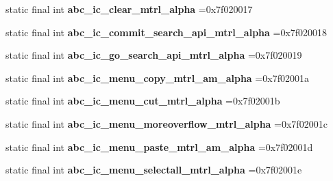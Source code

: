 \begin{DoxyCompactItemize}
\item 
\mbox{\label{classproject4_1_1xaria_1_1R_1_1drawable_a109df00d02effba1b95fb2a04dbc3ffc}} 
static final int {\bfseries abc\+\_\+ic\+\_\+clear\+\_\+mtrl\+\_\+alpha} =0x7f020017
\item 
\mbox{\label{classproject4_1_1xaria_1_1R_1_1drawable_a8fbcc6db37848e33c7275c6ebd2cf23a}} 
static final int {\bfseries abc\+\_\+ic\+\_\+commit\+\_\+search\+\_\+api\+\_\+mtrl\+\_\+alpha} =0x7f020018
\item 
\mbox{\label{classproject4_1_1xaria_1_1R_1_1drawable_aa8054feafb8707a1301d44de33ea33dc}} 
static final int {\bfseries abc\+\_\+ic\+\_\+go\+\_\+search\+\_\+api\+\_\+mtrl\+\_\+alpha} =0x7f020019
\item 
\mbox{\label{classproject4_1_1xaria_1_1R_1_1drawable_ad145ff3b028c513aee4c6235bb613f0f}} 
static final int {\bfseries abc\+\_\+ic\+\_\+menu\+\_\+copy\+\_\+mtrl\+\_\+am\+\_\+alpha} =0x7f02001a
\item 
\mbox{\label{classproject4_1_1xaria_1_1R_1_1drawable_ae86584cc47dc0992fb3c8fce9b237b7c}} 
static final int {\bfseries abc\+\_\+ic\+\_\+menu\+\_\+cut\+\_\+mtrl\+\_\+alpha} =0x7f02001b
\item 
\mbox{\label{classproject4_1_1xaria_1_1R_1_1drawable_ae98256d4832a36d3dbf85edcdeb0c8e3}} 
static final int {\bfseries abc\+\_\+ic\+\_\+menu\+\_\+moreoverflow\+\_\+mtrl\+\_\+alpha} =0x7f02001c
\item 
\mbox{\label{classproject4_1_1xaria_1_1R_1_1drawable_a3989a69ce78fa6cf103f5a9e8a7afaed}} 
static final int {\bfseries abc\+\_\+ic\+\_\+menu\+\_\+paste\+\_\+mtrl\+\_\+am\+\_\+alpha} =0x7f02001d
\item 
\mbox{\label{classproject4_1_1xaria_1_1R_1_1drawable_a64d3837144ffe2e6eb29a2417fed5ccc}} 
static final int {\bfseries abc\+\_\+ic\+\_\+menu\+\_\+selectall\+\_\+mtrl\+\_\+alpha} =0x7f02001e
\item 

\end{DoxyCompactItemize}
